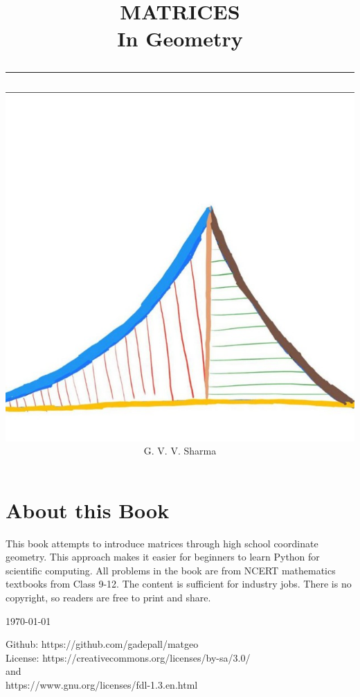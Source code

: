 \documentclass[journal]{IEEEtran}
\begin{document}

\onecolumn


\title{
	\begin{flushleft}
	MATRICES \\ In Geometry
	\\
\rule{0.4\columnwidth}{0.4pt}
\end{flushleft}
}
\author{
\vspace{7cm}
	\begin{flushleft}
\includegraphics[width=0.75\columnwidth]{figs/logo.jpg}
\\
		{	\huge G. V. V. Sharma}
	\end{flushleft}
}
\maketitle

\newpage
\section*{About this Book}

This book attempts to introduce matrices through high school coordinate geometry. This approach makes it easier for beginners to learn Python for scientific computing. All problems in the book are from NCERT mathematics textbooks from Class 9-12.   
The content is sufficient for industry jobs.
There is no copyright, so readers are free to print and share.  
\begin{flushright}
\today
\end{flushright}
Github: https://github.com/gadepall/matgeo
		\\
License: https://creativecommons.org/licenses/by-sa/3.0/
\\
and
\\
https://www.gnu.org/licenses/fdl-1.3.en.html
\end{document}
